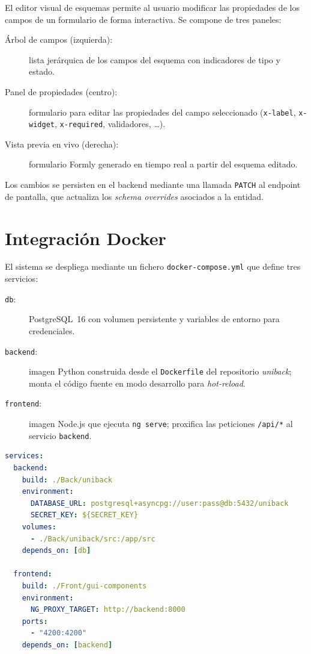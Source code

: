 
El editor visual de esquemas permite al usuario modificar las propiedades de los campos
de un formulario de forma interactiva. Se compone de tres paneles:

\begin{description}
  \item[Árbol de campos (izquierda):] lista jerárquica de los campos del esquema con
    indicadores de tipo y estado.
  \item[Panel de propiedades (centro):] formulario para editar las propiedades del campo
    seleccionado (\texttt{x-label}, \texttt{x-widget}, \texttt{x-required},
    validadores, \ldots).
  \item[Vista previa en vivo (derecha):] formulario Formly generado en tiempo real a
    partir del esquema editado.
\end{description}

Los cambios se persisten en el backend mediante una llamada \texttt{PATCH} al endpoint
de pantalla, que actualiza los \textit{schema overrides} asociados a la entidad.

\section{Integración Docker}
\label{sec:docker}

El sistema se despliega mediante un fichero \texttt{docker-compose.yml} que define tres
servicios:

\begin{description}
  \item[\texttt{db}:] PostgreSQL~16 con volumen persistente y variables de entorno para
    credenciales.
  \item[\texttt{backend}:] imagen Python construida desde el \texttt{Dockerfile} del
    repositorio \textit{uniback}; monta el código fuente en modo desarrollo para
    \textit{hot-reload}.
  \item[\texttt{frontend}:] imagen Node.js que ejecuta \texttt{ng serve}; proxifica las
    peticiones \texttt{/api/*} al servicio \texttt{backend}.
\end{description}

\begin{lstlisting}[language=yaml, caption={Fragmento del docker-compose.yml de desarrollo.}]
services:
  backend:
    build: ./Back/uniback
    environment:
      DATABASE_URL: postgresql+asyncpg://user:pass@db:5432/uniback
      SECRET_KEY: ${SECRET_KEY}
    volumes:
      - ./Back/uniback/src:/app/src
    depends_on: [db]

  frontend:
    build: ./Front/gui-components
    environment:
      NG_PROXY_TARGET: http://backend:8000
    ports:
      - "4200:4200"
    depends_on: [backend]
\end{lstlisting}
